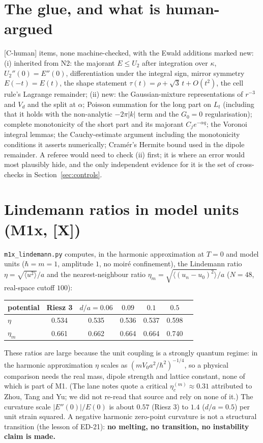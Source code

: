 \documentclass[11pt]{article}
\newcommand{\tier}[1]{\textsf{[#1]}}
\newcommand{\tCh}{\tier{C-human}}
\newcommand{\tX}{\tier{X}}
\begin{document}
\section{The glue, and what is human-argued}\label{sec:glue}
\tCh{} items, none machine-checked, with the Ewald additions marked new:
(i) inherited from N2: the majorant $E\le U_2$ after integration over $\kappa$, $U_2''(0)=E''(0)$, differentiation under the integral sign, mirror symmetry $E(-t)=E(t)$, the shape statement $\tau(t)=\rho+\sqrt3\,t+O(t^2)$, the cell rule's Lagrange remainder;
(ii) new: the Gaussian-mixture representations of $r^{-3}$ and $V_d$ and the split at $\alpha$; Poisson summation for the long part on $L_t$ (including that it holds with the non-analytic $-2\pi|k|$ term and the $G_0=0$ regularisation); complete monotonicity of the short part and its majorant $C_je^{-\alpha q}$; the Voronoi integral lemmas; the Cauchy-estimate argument including the monotonicity conditions it asserts numerically; Cram\'er's Hermite bound used in the dipole remainder.
A referee would need to check (ii) first; it is where an error would most plausibly hide, and the only independent evidence for it is the set of cross-checks in Section~\ref{sec:controls}.

\section{Lindemann ratios in model units (M1x, \tX)}\label{sec:m1x}
\texttt{m1x\_lindemann.py} computes, in the harmonic approximation at $T=0$ and model units ($\hbar=m=1$, amplitude $1$, no moir\'e confinement), the Lindemann ratio $\eta=\sqrt{\langle u^2\rangle}/a$ and the nearest-neighbour ratio $\eta_m=\sqrt{\langle(u_n-u_0)^2\rangle}/a$ ($N=48$, real-space cutoff $100$):
\begin{center}\small\begin{tabular}{lcccccc}\toprule
potential & Riesz 3 & $d/a=0.06$ & $0.09$ & $0.1$ & $0.5$\\\midrule
$\eta$ & 0.534 & 0.535 & 0.536 & 0.537 & 0.598\\
$\eta_m$ & 0.661 & 0.662 & 0.664 & 0.664 & 0.740\\
\bottomrule\end{tabular}\end{center}
These ratios are large because the unit coupling is a strongly quantum regime: in the harmonic approximation $\eta$ scales as $(mV_0a^2/\hbar^2)^{-1/4}$, so a physical comparison needs the real mass, dipole strength and lattice constant, none of which is part of M1. (The lane notes quote a critical $\eta_c^{(m)}\approx0.31$ attributed to Zhou, Tang and Yu; we did not re-read that source and rely on none of it.) The curvature scale $|E''(0)|/E(0)$ is about $0.57$ (Riesz 3) to $1.4$ ($d/a=0.5$) per unit strain squared. A negative harmonic zero-point curvature is not a structural transition (the lesson of ED-21): \textbf{no melting, no transition, no instability claim is made.}
\end{document}
